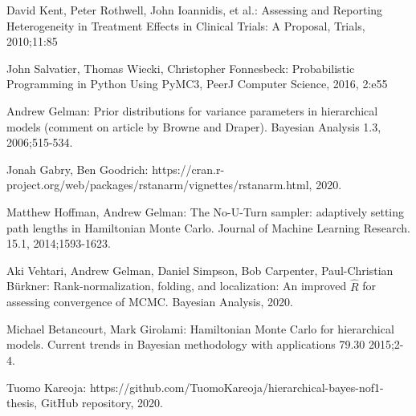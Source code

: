 \documentclass[12pt,a4paper,leqno]{report}
\theoremstyle{plain}
\theoremstyle{definition}
\theoremstyle{remark}
\begin{document}
\begin{thebibliography}{4}
    David Kent, Peter Rothwell, John Ioannidis, et al.: Assessing and Reporting Heterogeneity in
    Treatment Effects in Clinical Trials: A Proposal, Trials, 2010;11:85

    John Salvatier, Thomas Wiecki, Christopher Fonnesbeck: Probabilistic Programming in Python Using PyMC3, PeerJ Computer
    Science, 2016, 2:e55

    Andrew Gelman: Prior distributions for variance parameters in hierarchical models
    (comment on article by Browne and Draper). Bayesian Analysis 1.3, 2006;515-534.

    Jonah Gabry, Ben Goodrich:
    https://cran.r-project.org/web/packages/rstanarm/vignettes/rstanarm.html, 2020.
    
    Matthew Hoffman, Andrew Gelman: The No-U-Turn sampler: adaptively setting path
    lengths in Hamiltonian Monte Carlo. Journal of Machine Learning Research. 15.1,
    2014;1593-1623.
    
    Aki Vehtari, Andrew Gelman, Daniel Simpson, Bob Carpenter, Paul-Christian Bürkner:
    Rank-normalization, folding, and localization: An improved $\widehat {R} $ for
    assessing convergence of MCMC. Bayesian Analysis, 2020.

    Michael Betancourt, Mark Girolami: Hamiltonian Monte Carlo for hierarchical models.
    Current trends in Bayesian methodology with applications 79.30 2015;2-4.

    Tuomo Kareoja: https://github.com/TuomoKareoja/hierarchical-bayes-nof1-thesis,
    GitHub repository, 2020.

\end{thebibliography}
\end{document}
